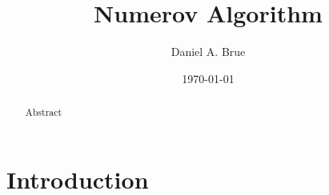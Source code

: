 \documentclass[preprent]{revtex4}
\begin{document}
\title{Numerov Algorithm}
\author{Daniel A. Brue}
\date{\today}
\begin{abstract}
Abstract
\end{abstract}
\maketitle

\section{Introduction}
\end{document}
